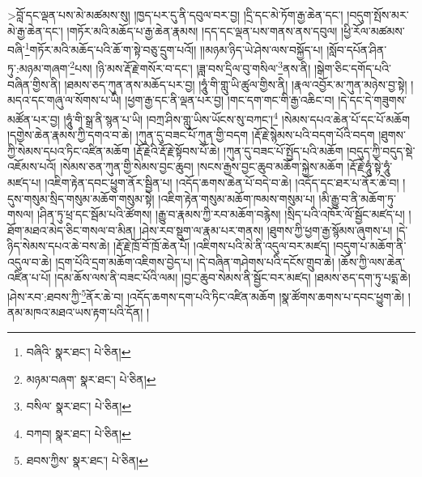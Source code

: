 >བློ་དང་ལྡན་པས་མེ་མཚམས་སུ། །ཁྱད་པར་དུ་ནི་དབུལ་བར་བྱ། །དྲི་དང་མེ་ཏོག་རྒྱ་ཆེན་དང་། །བདུག་སྤོས་མར་མེ་རྒྱ་ཆེན་དང་། །གཏོར་མའི་མཆོད་པ་རྒྱ་ཆེན་རྣམས། །དད་དང་ལྡན་པས་གནས་ནས་དབུལ། །ཕྱི་རོལ་མཚམས་བཞི་\footnote{བཞིའི་  སྣར་ཐང་།  པེ་ཅིན། }གཏོར་མའི་མཆོད་པའི་ཆོ་ག་སྟེ་བཅུ་དྲུག་པའོ།། །།མཉམ་ཉིད་ཡེ་ཤེས་ལས་བསྐྱོད་པ། །སློབ་དཔོན་ཤིན་ཏུ་:མཉམ་གཞག་\footnote{མཉམ་བཞག་  སྣར་ཐང་།  པེ་ཅིན། }པས། །ཉི་མས་རྡོ་རྗེ་གསོར་བ་དང་། །ཟླ་བས་དྲིལ་བུ་གསིལ་\footnote{བསིལ་  སྣར་ཐང་།  པེ་ཅིན། }ནས་ནི། །སྒེག་ཅིང་དགོད་པའི་བཞིན་གྱིས་ནི། །ཐམས་ཅད་ཀུན་ནས་མཆོད་པར་བྱ། །ཧཱུཾ་གི་གླུ་ཡི་ཚུལ་གྱིས་ནི། །རྣལ་འབྱོར་མ་ཀུན་མཉེས་བྱ་སྟེ། །མདའ་དང་གཞུ་ལ་སོགས་པ་ཡི། །ཕྱག་རྒྱ་དང་ནི་ལྡན་པར་བྱ། །གང་དག་གང་གི་རྒྱ་འཆིང་བ། །དེ་དང་དེ་གཟུགས་མཚོན་པར་བྱ། །ཧཱུཾ་གི་སྒྲ་ནི་སྙན་པ་ཡི། །བཀྲ་ཤིས་གླུ་ཡིས་ཡོངས་སུ་བཀང་།\footnote{བཀབ།  སྣར་ཐང་།  པེ་ཅིན། } །སེམས་དཔའ་ཆེན་པོ་དང་པོ་མཆོག །དགྱེས་ཆེན་རྣམས་ཀྱི་དགའ་བ་ཆེ། །ཀུན་དུ་བཟང་པོ་ཀུན་གྱི་བདག །རྡོ་རྗེ་སྙེམས་པའི་བདག་པོའི་བདག །ཐུགས་ཀྱི་སེམས་དཔའ་ཏིང་འཛིན་མཆོག །རྡོ་རྗེའི་རྡོ་རྗེ་སྟོབས་པོ་ཆེ། །ཀུན་དུ་བཟང་པོ་སྤྱོད་པའི་མཆོག །བདུད་ཀྱི་བདུད་སྡེ་འཇོམས་པའོ། །སེམས་ཅན་ཀུན་གྱི་སེམས་བྱང་ཆུབ། །སངས་རྒྱས་བྱང་ཆུབ་མཆོག་སྐྱེས་མཆོག །རྡོ་རྗེ་ཧཱུཾ་སྟེ་ཧཱུཾ་མཛད་པ། །འཇིག་རྟེན་དབང་ཕྱུག་ནོར་སྦྱིན་པ། །འདོད་ཆགས་ཆེན་པོ་བདེ་བ་ཆེ། །འདོད་དང་ཐར་པ་ནོར་ཆེ་བ། །དུས་གསུམ་སྲིད་གསུམ་མཆོག་གསུམ་སྟེ། །འཇིག་རྟེན་གསུམ་མཆོག་ཁམས་གསུམ་པ། །མི་རྒྱུ་བ་ནི་མཆོག་ཏུ་གསལ། །ཤིན་ཏུ་ཕྲ་དང་སྦོམ་པའི་ཚོགས། །རྒྱུ་བ་རྣམས་ཀྱི་རབ་མཆོག་བརྙེས། །སྲིད་པའི་འཁོར་ལོ་སྦྱོང་མཛད་པ། །ཐོག་མཐའ་མེད་ཅིང་གསལ་བ་མིན། །ཤེས་རབ་སྡུག་ལ་རྣམ་པར་གནས། །ཐུགས་ཀྱི་ཕྱག་རྒྱ་སྙོམས་ཞུགས་པ། །དེ་ཉིད་སེམས་དཔའ་ཆེ་བས་ཆེ། །རྡོ་རྗེ་ཁྲོ་བོ་ཁྲོ་ཆེན་པོ། །འཇིགས་པའི་མེ་ནི་འདུལ་བར་མཛད། །བདུག་པ་མཆོག་ནི་འདུལ་བ་ཆེ། །དྲག་པོའི་དྲག་མཆོག་འཇིགས་བྱེད་པ། །དེ་བཞིན་གཤེགས་པའི་དངོས་གྲུབ་ཆེ། །ཆོས་ཀྱི་ལས་ཆེན་འཛིན་པ་པོ། །དམ་ཆོས་ལས་ནི་བཟང་པོའི་ལམ། །བྱང་ཆུབ་སེམས་ནི་སྦྱོང་བར་མཛད། །ཐམས་ཅད་དག་ཏུ་པདྨ་ཆེ། །ཤེས་རབ་:ཐབས་ཀྱི་\footnote{ཐབས་ཀྱིས་  སྣར་ཐང་།  པེ་ཅིན། }ནོར་ཆེ་བ། །འདོད་ཆགས་དག་པའི་ཏིང་འཛིན་མཆོག །སྣ་ཚོགས་ཆགས་པ་དབང་ཕྱུག་ཆེ། །ནམ་མཁའ་མཐའ་ཡས་རྟག་པའི་དོན། །
